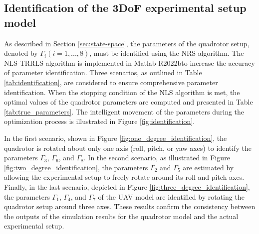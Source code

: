 \documentclass[3p,times]{elsarticle}
\begin{document}
\subsection{Identification of the 3DoF experimental setup model}

\noindent As described in Section \ref{sec:state-space}, the parameters of the quadrotor setup, denoted by $\Gamma_i (i=1, ..., 8)$, must be identified using the NRS algorithm. The NLS-TRRLS algorithm is implemented in Matlab R2022b\textregistered to increase the accuracy of parameter identification. Three scenarios, as outlined in Table \ref{tab:identification}, are considered to ensure comprehensive parameter identification. When the stopping condition of the NLS algorithm is met, the optimal values of the quadrotor parameters are computed and presented in Table \ref{tab:true_parameters}. The intelligent movement of the parameters during the optimization process is illustrated in Figure \ref{fig:identification}.

In the first scenario, shown in Figure \ref{fig:one_degree_identification}, the quadrotor is rotated about only one axis (roll, pitch, or yaw axes) to identify the parameters $\Gamma_3$, $\Gamma_6$, and $\Gamma_8$. In the second scenario, as illustrated in Figure \ref{fig:two_degree_identification}, the parameters $\Gamma_2$ and $\Gamma_5$ are estimated by allowing the experimental setup to freely rotate around its roll and pitch axes. Finally, in the last scenario, depicted in Figure \ref{fig:three_degree_identification}, the parameters $\Gamma_1$, $\Gamma_4$, and $\Gamma_7$ of the UAV model are identified by rotating the quadrotor setup around three axes. These results confirm the consistency between the outputs of the simulation results for the quadrotor model and the actual experimental setup.
\end{document}
